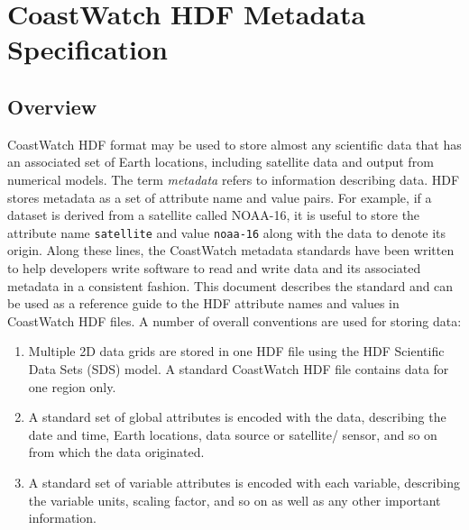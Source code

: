\chapter{CoastWatch HDF Metadata Specification}
\label{metadata}

\section{Overview}

CoastWatch HDF format may be used to store almost any scientific data
that has an associated set of Earth locations, including satellite
data and output from numerical models. The term {\em metadata} refers
to information describing data.  HDF stores metadata as a set of
attribute name and value pairs. For example, if a dataset is derived
from a satellite called NOAA-16, it is useful to store the attribute
name {\tt satellite} and value {\tt noaa-16} along with the data to
denote its origin. Along these lines, the CoastWatch metadata
standards have been written to help developers write software to read
and write data and its associated metadata in a consistent
fashion. This document describes the standard and can be used as a
reference guide to the HDF attribute names and values in CoastWatch
HDF files. A number of overall conventions are used for storing data:
\begin{enumerate}

  \item Multiple 2D data grids are stored in one HDF file using the
  HDF Scientific Data Sets (SDS) model. A standard CoastWatch HDF file
  contains data for one region only.

  \item A standard set of global attributes is encoded with the data,
  describing the date and time, Earth locations, data source or
  satellite/ sensor, and so on from which the data originated.

  \item A standard set of variable attributes is encoded with each
  variable, describing the variable units, scaling factor, and so on
  as well as any other important information.

\end{enumerate}


